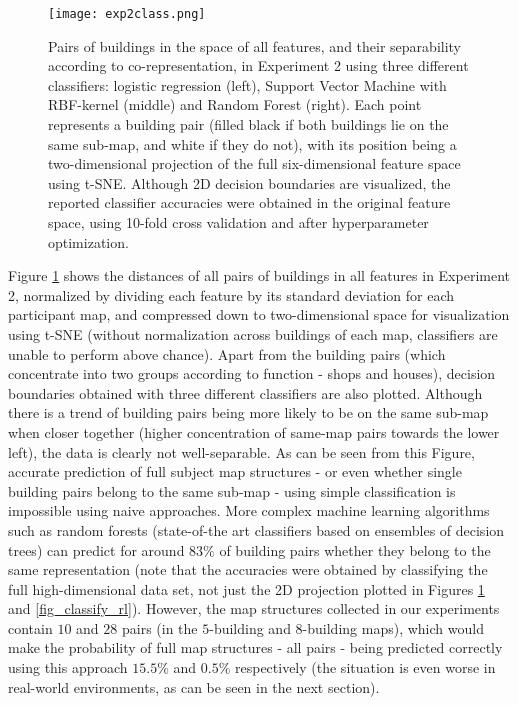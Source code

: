 \begin{figure}[h]
	\centering
	\texttt{[image: exp2class.png]}
	\caption{Pairs of buildings in the space of all features, and their separability according to co-representation, in Experiment 2 using three different classifiers: logistic regression (left), Support Vector Machine with RBF-kernel (middle) and Random Forest (right). Each point represents a building pair (filled black if both buildings lie on the same sub-map, and white if they do not), with its position being a two-dimensional projection of the full six-dimensional feature space using t-SNE.  Although 2D decision boundaries are visualized, the reported classifier accuracies were obtained in the original feature space, using 10-fold cross validation and after hyperparameter optimization.}
	\label{fig_classify}
\end{figure}

Figure \ref{fig_classify} shows the distances of all pairs of buildings in all features in Experiment 2, normalized by dividing each feature by its standard deviation for each participant map, and compressed down to two-dimensional space for visualization using t-SNE \citep{van2008visualizing} (without normalization across buildings of each map, classifiers are unable to perform above chance). Apart from the building pairs (which concentrate into two groups according to function - shops and houses), decision boundaries obtained with three different classifiers are also plotted. Although there is a trend of building pairs being more likely to be on the same sub-map when closer together (higher concentration of same-map pairs towards the lower left), the data is clearly not well-separable. As can be seen from this Figure, accurate prediction of full subject map structures - or even whether single building pairs belong to the same sub-map - using simple classification is impossible using naive approaches. More complex machine learning algorithms such as random forests (state-of-the art classifiers based on ensembles of decision trees) \citep{breiman2001random} can predict for around $83 \%$ of building pairs whether they belong to the same representation (note that the accuracies were obtained by classifying the full high-dimensional data set, not just the 2D projection plotted in Figures \ref{fig_classify} and \ref{fig_classify_rl}). However, the map structures collected in our experiments contain $10$ and $28$ pairs (in the $5$-building and $8$-building maps), which would make the probability of full map structures - all pairs - being predicted correctly using this approach $15.5 \%$ and $0.5 \%$ respectively (the situation is even worse in real-world environments, as can be seen in the next section).

